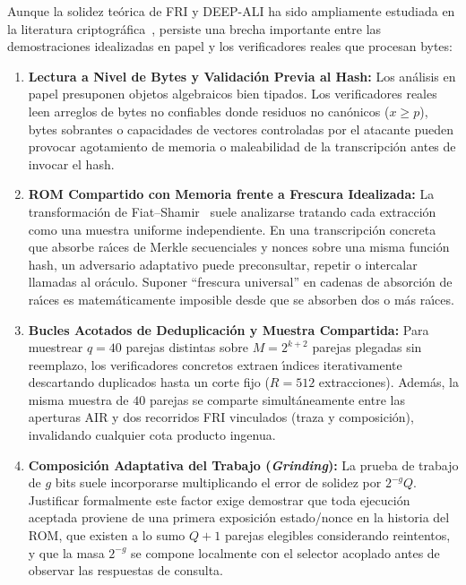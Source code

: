 \documentclass[conference]{IEEEtran}
\theoremstyle{definition}
\begin{document}
Aunque la solidez te\'{o}rica de FRI y DEEP-ALI ha sido ampliamente estudiada en la literatura criptogr\'{a}fica~\cite{ben2020proximity,habock2022summary}, persiste una brecha importante entre las demostraciones idealizadas en papel y los verificadores reales que procesan bytes:

\begin{enumerate}
    \setlength{\itemsep}{3pt}
    \item \textbf{Lectura a Nivel de Bytes y Validaci\'{o}n Previa al Hash:} Los an\'{a}lisis en papel presuponen objetos algebraicos bien tipados. Los verificadores reales leen arreglos de bytes no confiables donde residuos no can\'{o}nicos ($x \ge p$), bytes sobrantes o capacidades de vectores controladas por el atacante pueden provocar agotamiento de memoria o maleabilidad de la transcripci\'{o}n antes de invocar el hash.
    \item \textbf{ROM Compartido con Memoria frente a Frescura Idealizada:} La transformaci\'{o}n de Fiat--Shamir~\cite{fiat1986prove,ben2016aurora} suele analizarse tratando cada extracci\'{o}n como una muestra uniforme independiente. En una transcripci\'{o}n concreta que absorbe ra\'{\i}ces de Merkle secuenciales y nonces sobre una misma funci\'{o}n hash, un adversario adaptativo puede preconsultar, repetir o intercalar llamadas al or\'{a}culo. Suponer ``frescura universal'' en cadenas de absorci\'{o}n de ra\'{\i}ces es matem\'{a}ticamente imposible desde que se absorben dos o m\'{a}s ra\'{\i}ces.
    \item \textbf{Bucles Acotados de Deduplicaci\'{o}n y Muestra Compartida:} Para muestrear $q = 40$ parejas distintas sobre $M = 2^{k+2}$ parejas plegadas sin reemplazo, los verificadores concretos extraen \'{\i}ndices iterativamente descartando duplicados hasta un corte fijo ($R = 512$ extracciones). Adem\'{a}s, la misma muestra de $40$ parejas se comparte simult\'{a}neamente entre las aperturas AIR y dos recorridos FRI vinculados (traza y composici\'{o}n), invalidando cualquier cota producto ingenua.
    \item \textbf{Composici\'{o}n Adaptativa del Trabajo (\emph{Grinding}):} La prueba de trabajo de $g$ bits suele incorporarse multiplicando el error de solidez por $2^{-g} Q$. Justificar formalmente este factor exige demostrar que toda ejecuci\'{o}n aceptada proviene de una primera exposici\'{o}n estado/nonce en la historia del ROM, que existen a lo sumo $Q + 1$ parejas elegibles considerando reintentos, y que la masa $2^{-g}$ se compone localmente con el selector acoplado antes de observar las respuestas de consulta.
\end{enumerate}
\end{document}
